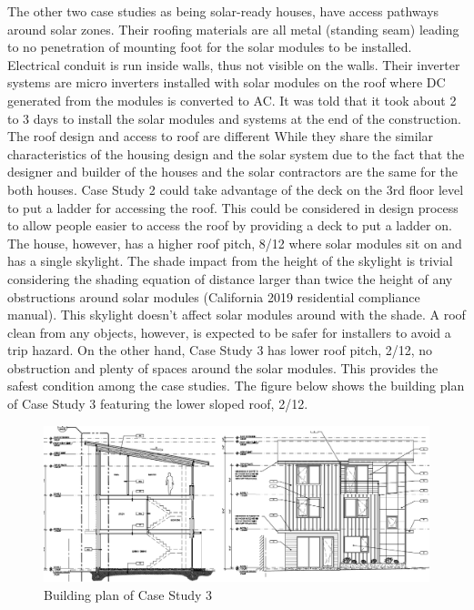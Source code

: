 \documentclass[]{article}
\begin{document}
The other two case studies as being solar-ready houses, have access
pathways around solar zones. Their roofing materials are all metal
(standing seam) leading to no penetration of mounting foot for the solar
modules to be installed. Electrical conduit is run inside walls, thus
not visible on the walls. Their inverter systems are micro inverters
installed with solar modules on the roof where DC generated from the
modules is converted to AC. It was told that it took about 2 to 3 days
to install the solar modules and systems at the end of the construction.
The roof design and access to roof are different While they share the
similar characteristics of the housing design and the solar system due
to the fact that the designer and builder of the houses and the solar
contractors are the same for the both houses. Case Study 2 could take
advantage of the deck on the 3rd floor level to put a ladder for
accessing the roof. This could be considered in design process to allow
people easier to access the roof by providing a deck to put a ladder on.
The house, however, has a higher roof pitch, 8/12 where solar modules
sit on and has a single skylight. The shade impact from the height of
the skylight is trivial considering the shading equation of distance
larger than twice the height of any obstructions around solar modules
(California 2019 residential compliance manual). This skylight doesn't
affect solar modules around with the shade. A roof clean from any
objects, however, is expected to be safer for installers to avoid a trip
hazard. On the other hand, Case Study 3 has lower roof pitch, 2/12, no
obstruction and plenty of spaces around the solar modules. This provides
the safest condition among the case studies. The figure below shows the
building plan of Case Study 3 featuring the lower sloped roof, 2/12.

\begin{figure}
\centering
\includegraphics{case3.png}
\caption{Building plan of Case Study 3}
\end{figure}
\end{document}
